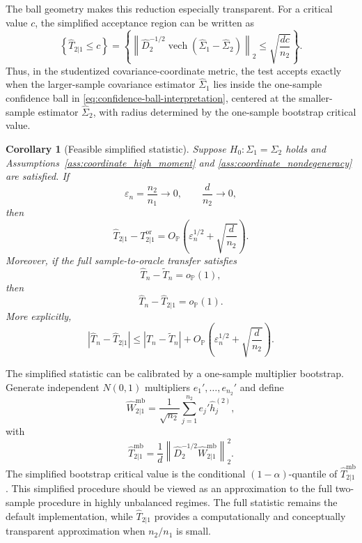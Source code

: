 \documentclass[
  12pt]{article}
\theoremstyle{plain}
\newtheorem{corollary}[theorem]{Corollary}
\theoremstyle{definition}
\theoremstyle{remark}
\begin{document}
The ball geometry makes this reduction especially transparent.  For a critical
value \(c\), the simplified acceptance region can be written as
\begin{equation}
\label{eq:confidence-ball-interpretation}
\left\{
\widehat T_{2|1}\le c
\right\}
=
\left\{
\left\|
\widehat D_2^{-1/2}
\operatorname{vech}(\widehat\Sigma_1-\widehat\Sigma_2)
\right\|_2
\le
\sqrt{\frac{dc}{n_2}}
\right\}.
\end{equation}
Thus, in the studentized covariance-coordinate metric, the test accepts exactly
when the larger-sample covariance estimator \(\widehat\Sigma_1\) lies inside
the one-sample confidence ball in \eqref{eq:confidence-ball-interpretation},
centered at the smaller-sample estimator \(\widehat\Sigma_2\), with radius
determined by the one-sample bootstrap critical value.

\begin{corollary}[Feasible simplified statistic]
\label{cor:feasible_unbalanced}
Suppose \(H_0:\Sigma_1=\Sigma_2\) holds and
Assumptions~\ref{ass:coordinate_high_moment} and
\ref{ass:coordinate_nondegeneracy} are satisfied.  If
\[
\varepsilon_n=\frac{n_2}{n_1}\to0,
\qquad
\frac d{n_2}\to0,
\]
then
\[
\widehat T_{2|1}
-
T_{2|1}^{\mathrm{or}}
=
O_{\mathbb P}
\left(
\varepsilon_n^{1/2}
+
\sqrt{\frac d{n_2}}
\right).
\]
Moreover, if the full sample-to-oracle transfer satisfies
\[
\widehat T_n-\widetilde T_n=o_{\mathbb P}(1),
\]
then
\[
\widehat T_n-\widehat T_{2|1}=o_{\mathbb P}(1).
\]
More explicitly,
\[
|\widehat T_n-\widehat T_{2|1}|
\le
|\widehat T_n-\widetilde T_n|
+
O_{\mathbb P}
\left(
\varepsilon_n^{1/2}
+
\sqrt{\frac d{n_2}}
\right).
\]
\end{corollary}

The simplified statistic can be calibrated by a one-sample multiplier bootstrap.
Generate independent \(N(0,1)\) multipliers \(e_1',\ldots,e_{n_2}'\) and define
\[
\widehat W_{2|1}^{\mathrm{mb}}
=
\frac1{\sqrt{n_2}}
\sum_{j=1}^{n_2}
e_j'\widehat h_j^{(2)},
\]
with
\[
\widehat T_{2|1}^{\mathrm{mb}}
=
\frac1d
\left\|
\widehat D_2^{-1/2}\widehat W_{2|1}^{\mathrm{mb}}
\right\|_2^2 .
\]
The simplified bootstrap critical value is the conditional
\((1-\alpha)\)-quantile of \(\widehat T_{2|1}^{\mathrm{mb}}\).  This simplified
procedure should be viewed as an approximation to the full two-sample procedure
in highly unbalanced regimes.  The full statistic remains the default
implementation, while \(\widehat T_{2|1}\) provides a computationally and
conceptually transparent approximation when \(n_2/n_1\) is small.
\end{document}

